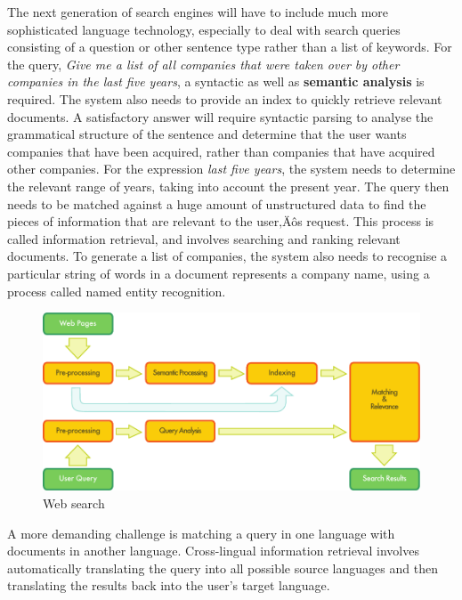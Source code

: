 \begin{multicols}{2}
The next generation of search engines will have to include much more
sophisticated language technology, especially to deal with search
queries consisting of a question or other sentence type rather than a
list of keywords. For the query, \textit{Give me a list of all
  companies that were taken over by other companies in the last five
  years}, a syntactic as well as \textbf{semantic analysis} is
required. The system also needs to provide an index to quickly
retrieve relevant documents. A satisfactory answer will require
syntactic parsing to analyse the grammatical structure of the sentence
and determine that the user wants companies that have been acquired,
rather than companies that have acquired other companies. For the
expression \textit{last five years}, the system needs to determine the
relevant range of years, taking into account the present year. The
query then needs to be matched against a huge amount of unstructured
data to find the pieces of information that are relevant to the user‚Äôs
request. This process is called information retrieval, and involves
searching and ranking relevant documents. To generate a list of
companies, the system also needs to recognise a particular string of
words in a document represents a company name, using a process called
named entity recognition.


\begin{figure}[htb]
  \center
  \includegraphics[width=\textwidth]{../_media/english/web_search_architecture}
  \caption{Web search}
  \label{fig:websearcharch_en}
 \end{figure}

A more demanding challenge is matching a query in one language with
documents in another language. Cross-lingual information retrieval
involves automatically translating the query into all possible source
languages and then translating the results back into the user's target
language.
 

\end{multicols}
